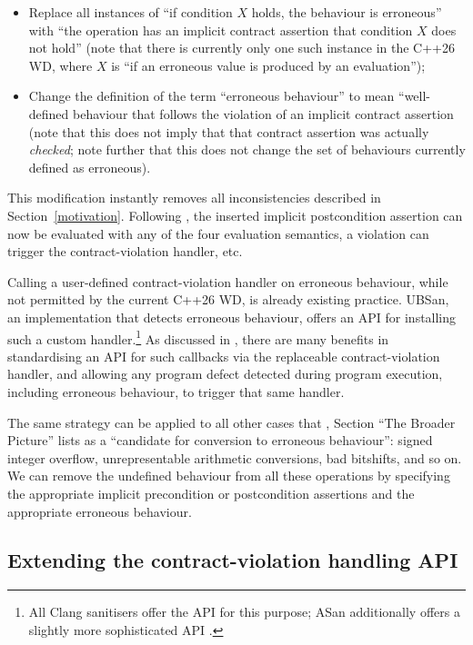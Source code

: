 \begin{itemize}
\item Replace all instances of ``if condition $X$ holds, the behaviour is erroneous'' with ``the operation has an implicit contract assertion that condition $X$ does not hold'' (note that there is currently only one such instance in the C++26 WD, where $X$ is ``if an erroneous value is produced by an evaluation'');
\item Change the definition of the term ``erroneous behaviour'' to mean ``well-defined behaviour that follows the violation of an implicit contract assertion (note that this does not imply that that contract assertion was actually \emph{checked}; note further that this does not change the set of behaviours currently defined as erroneous).
\end{itemize}

This modification instantly removes all inconsistencies described in Section~\ref{motivation}. Following \cite{P2900R13}, the inserted implicit postcondition assertion can now be evaluated with any of the four evaluation semantics, a violation can trigger the contract-violation handler, etc. 

Calling a user-defined contract-violation handler on erroneous behaviour, while not permitted by the current C++26 WD, is already existing practice. UBSan, an implementation that detects erroneous behaviour, offers an API for installing such a custom handler.\footnote{All Clang sanitisers offer the API  for this purpose; ASan additionally offers a slightly more sophisticated API .} As discussed in \cite{P3100R1}, there are many benefits in standardising an API for such callbacks via the replaceable contract-violation handler, and allowing any program defect detected during program execution, including erroneous behaviour, to trigger that same handler.

The same strategy can be applied to all other cases that \cite{P2795R5}, Section ``The Broader Picture'' lists as a ``candidate for conversion to erroneous behaviour'': signed integer overflow, unrepresentable arithmetic conversions, bad bitshifts, and so on. We can remove the undefined behaviour from all these operations by specifying the appropriate implicit precondition or postcondition assertions and the appropriate erroneous behaviour.

\subsection{Extending the contract-violation handling API}

